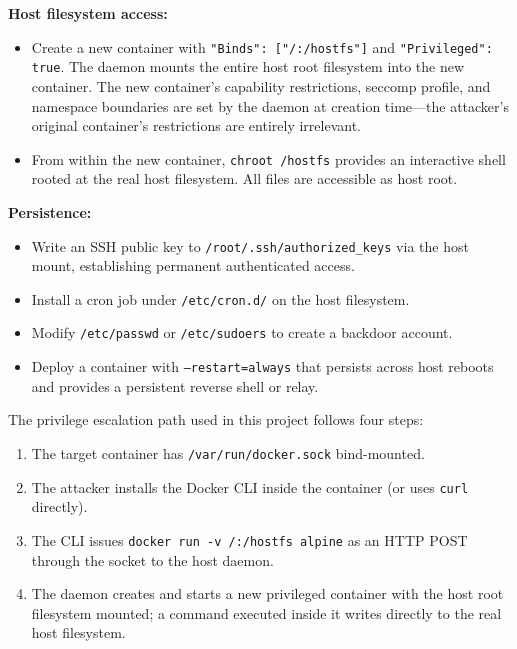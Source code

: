 \textbf{Host filesystem access:}

\begin{itemize}
    \item Create a new container with \texttt{"Binds": ["/:/hostfs"]} and
          \texttt{"Privileged": true}. The daemon mounts the entire host root
          filesystem into the new container. The new container's capability
          restrictions, seccomp profile, and namespace boundaries are set by the
          daemon at creation time---the attacker's original container's restrictions
          are entirely irrelevant.
    \item From within the new container, \texttt{chroot /hostfs} provides an
          interactive shell rooted at the real host filesystem. All files are
          accessible as host root.
\end{itemize}

\textbf{Persistence:}

\begin{itemize}
    \item Write an SSH public key to \texttt{/root/.ssh/authorized\_keys} via the
          host mount, establishing permanent authenticated access.
    \item Install a cron job under \texttt{/etc/cron.d/} on the host filesystem.
    \item Modify \texttt{/etc/passwd} or \texttt{/etc/sudoers} to create a
          backdoor account.
    \item Deploy a container with \texttt{--restart=always} that persists across
          host reboots and provides a persistent reverse shell or relay.
\end{itemize}

The privilege escalation path used in this project follows four steps:

\begin{enumerate}
    \item The target container has \texttt{/var/run/docker.sock} bind-mounted.
    \item The attacker installs the Docker CLI inside the container (or uses
          \texttt{curl} directly).
    \item The CLI issues \texttt{docker run -v /:/hostfs alpine} as an HTTP POST
          through the socket to the host daemon.
    \item The daemon creates and starts a new privileged container with the host
          root filesystem mounted; a command executed inside it writes directly to
          the real host filesystem.
\end{enumerate}

